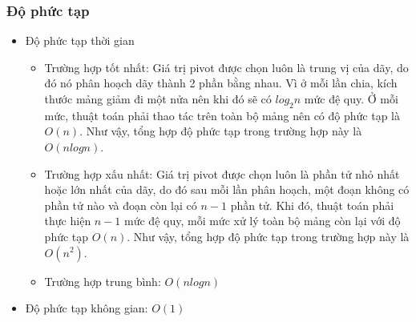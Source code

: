 \subsubsection{Độ phức tạp}

\begin{itemize}
    \item Độ phức tạp thời gian
    \begin{itemize}[label=$\circ$]
        \item Trường hợp tốt nhất: Giá trị pivot được chọn luôn là trung vị của dãy, do đó nó phân hoạch dãy thành 2 phần bằng nhau. Vì ở mỗi lần chia, kích thước mảng giảm đi một nửa nên khi đó sẽ có $log_2{n}$ mức đệ quy. Ở mỗi mức, thuật toán phải thao tác trên toàn bộ mảng nên có độ phức tạp là $O(n)$. Như vậy, tổng hợp độ phức tạp trong trường hợp này là $O(nlogn)$.
        
        \item Trường hợp xấu nhất: Giá trị pivot được chọn luôn là phần tử nhỏ nhất hoặc lớn nhất của dãy, do đó sau mỗi lần phân hoạch, một đoạn không có phần tử nào và đoạn còn lại có $n - 1$ phần tử. Khi đó, thuật toán phải thực hiện  $n - 1$ mức đệ quy, mỗi mức xử lý toàn bộ mảng còn lại với độ phức tạp $O(n)$. Như vậy, tổng hợp độ phức tạp trong trường hợp này là $O(n^2)$.
        
        \item Trường hợp trung bình: $O(nlogn)$ 
    \end{itemize}
    
    \item Độ phức tạp không gian: $O(1)$
\end{itemize}